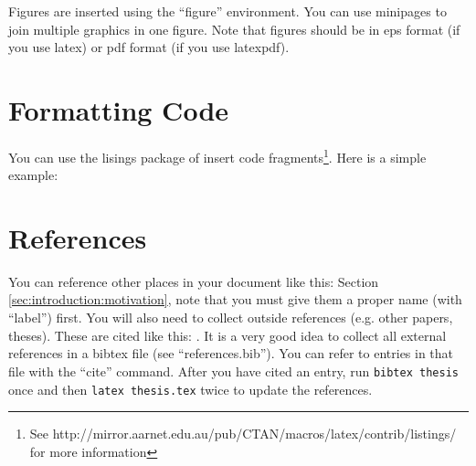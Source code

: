 Figures are inserted using the ``figure'' environment. You can use minipages to join multiple graphics in one figure. Note that figures should be in eps format (if you use latex) or pdf format (if you use latexpdf).

\section{Formatting Code}

You can use the lisings package of insert code fragments\footnote{See http://mirror.aarnet.edu.au/pub/CTAN/macros/latex/contrib/listings/ for more information}. Here is a simple example:

\lstset{language=java}
\lstset{linewidth=\textwidth}
\lstset{commentstyle=\textit, stringstyle=\upshape,showspaces=false}
\lstset{frame=tb}


\section{References}
You can reference other places in your document like this: Section \ref{sec:introduction:motivation}, note that you must give them a proper name (with ``label'') first. You will also need to collect outside references (e.g. other papers, theses). These are cited like this: \cite{examplecitation}. It is a very good idea to collect all external references in a bibtex file (see ``references.bib''). You can refer to entries in that file with the ``cite'' command. After you have cited an entry, run {\tt bibtex thesis} once and then {\tt latex thesis.tex} twice to update the references.
